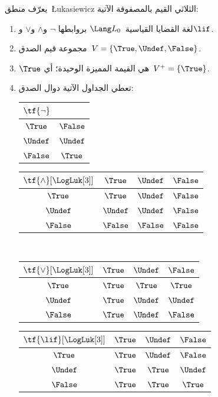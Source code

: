 \documentclass[../../../include/open-logic-section]{subfiles}
\begin{document}
\begin{defn}
يعرّف منطق~\L ukasiewicz الثلاثي القيم بالمصفوفة الآتية:
\begin{enumerate}
  \item لغة القضايا القياسية~$\Lang L_0$ بروابطها
  $\lnot$ و$\land$ و$\lor$ و$\lif$.
  \item مجموعة قيم الصدق~$V = \{\True, \Undef, \False\}$.
  \item $\True$ هي القيمة المميزة الوحيدة؛ أي~$V^+ = \{\True\}$.
  \item تعطي الجداول الآتية دوال الصدق:
  \begin{center}
    \begin{tabular}{c|c}
      $\tf{\lnot}$ & \\
      \hline
      $\True$ & $\False$ \\
      $\Undef$ & $\Undef$ \\
      $\False$ & $\True$
    \end{tabular}
    \quad
    \begin{tabular}{c|ccc}
      $\tf{\land}[\LogLuk[3]]$ & $\True$ & $\Undef$ & $\False$ \\
      \hline
      $\True$ & $\True$ & $\Undef$ & $\False$ \\
      $\Undef$ & $\Undef$ & $\Undef$ & $\False$\\
      $\False$ & $\False$ & $\False$ & $\False$
    \end{tabular}
    \\[2ex]
    \begin{tabular}{c|ccc}
      $\tf{\lor}[\LogLuk[3]]$ & $\True$ & $\Undef$ & $\False$ \\
      \hline
      $\True$ & $\True$ & $\True$ & $\True$ \\
      $\Undef$ & $\True$ & $\Undef$ & $\Undef$ \\
      $\False$ & $\True$ & $\Undef$ & $\False$
    \end{tabular}
    \quad
    \begin{tabular}{c|ccc}
      $\tf{\lif}[\LogLuk[3]]$ & $\True$ & $\Undef$ & $\False$ \\
      \hline
      $\True$ & $\True$ & $\Undef$ & $\False$ \\
      $\Undef$ & $\True$ & $\True$ & $\Undef$  \\
      $\False$ & $\True$ & $\True$ & $\True$
    \end{tabular}
  \end{center}
\end{enumerate}
\end{defn}
\end{document}
